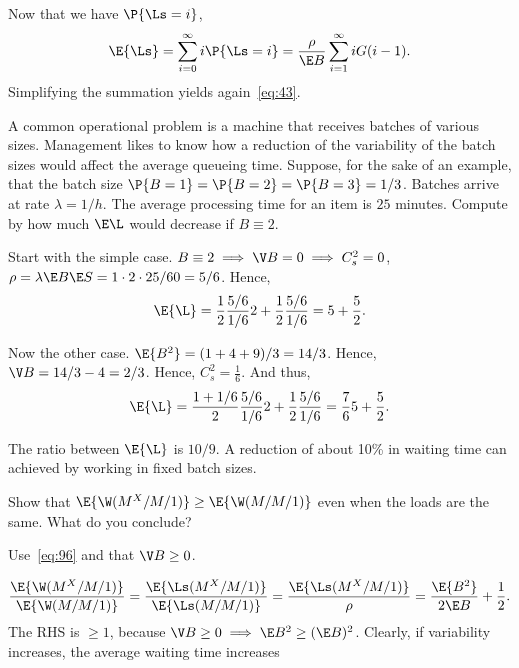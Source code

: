 Now that we have $\P{\Ls =i}$,
\begin{equation*}
 \E{\Ls} = \sum_{i=0}^\infty i \P{\Ls=i} = \frac{\rho}{\E B} \sum_{i=1}^\infty i G(i-1).
\end{equation*}
Simplifying  the summation yields again~\cref{eq:43}.


\begin{exercise}\label{ex:64}
 A common operational problem is a machine that receives batches of
 various sizes. Management likes to know how a reduction of the
 variability of the batch sizes would affect the average queueing time.
 Suppose, for the sake of an example, that the batch size
$\P{B=1} = \P{B=2} = \P{B=3} = 1/3$.
 Batches arrive at rate $\lambda = 1/h$.
 The average processing time for an item is $25$ minutes.
 Compute by how much  $\E\L$  would decrease if $B\equiv 2$.
\begin{solution}

 Start with the simple case.
 $B\equiv 2 \implies \V B=0 \implies C_s^2 = 0$,  $\rho=\lambda \E B \E S = 1\cdot 2 \cdot 25/60 = 5/6$. Hence,
 \begin{equation*}
 \E{\L} = \frac 12 \frac{5/6}{1/6} 2 + \frac 12 \frac{5/6}{1/6} = 5 + \frac52.
 \end{equation*}

Now the other case. $\E{B^2} = (1+4+9)/3 = 14/3$. Hence, $\V B=14/3 - 4=2/3$. Hence,
$C_s^2= \frac 16$.
And thus,
 \begin{equation*}
 \E{\L} = \frac {1+1/6}2 \frac{5/6}{1/6} 2 + \frac 12 \frac{5/6}{1/6} = \frac76 5 + \frac 52.
 \end{equation*}

 The ratio between $\E{\L}$ is $10/9$.
 A reduction of about 10\% in waiting time can achieved by working in fixed batch sizes.
\end{solution}
\end{exercise}

\begin{exercise}\label{ex:l-172}
 Show
that $\E{\W(M^X/M/1)} \geq \E{\W(M/M/1)}$ even when the loads are the same.
 What do you conclude?
\begin{hint}
Use~\cref{eq:96} and that $\V B \geq 0$.
\end{hint}
\begin{solution}
 \begin{equation*}
 \frac{\E{\W(M^X/M/1)}}{\E{\W(M/M/1)}} = \frac{\E{\Ls(M^X/M/1)}}{\E{\Ls(M/M/1)}} = \frac{\E{\Ls(M^X/M/1)}}{\rho} =
\frac{\E{B^2}}{2\E B} + \frac 12.
 \end{equation*}
 The RHS is $\geq 1$, because $\V B \geq 0 \implies \E B^2 \geq (\E B)^2$.
 Clearly, if variability increases, the average waiting time increases
\end{solution}
\end{exercise}


